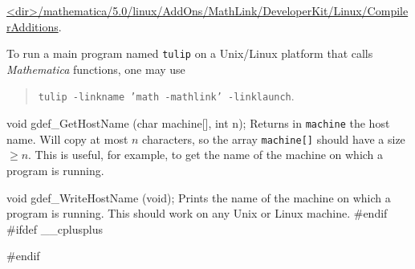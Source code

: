 {   \url{<dir>/mathematica/5.0/linux/AddOns/MathLink/DeveloperKit/Linux/CompilerAdditions}.

  To run a main program named \texttt{tulip} on a Unix/Linux platform
  that calls {\em  Mathematica} functions, one may use
 \begin{verse} 
  \texttt{tulip -linkname 'math -mathlink' -linklaunch}.
 \end{verse}
  \endtab
\fi  %


\code

void gdef_GetHostName (char machine[], int n);
\endcode
  \tab Returns in \texttt{machine} the host name. 
  Will copy at most $n$ characters, so the array \texttt{machine[]}
  should have a size $\ge n$. This is useful, for example,
  to get the name of the machine on which a program is running.
  \endtab
\code

void gdef_WriteHostName (void);
\endcode
  \tab Prints the name of the machine on which a program is running.
   This should work on any Unix or Linux machine.
  \endtab
\hide
\code
#endif
#ifdef __cplusplus
}
#endif
\endcode
\endhide

